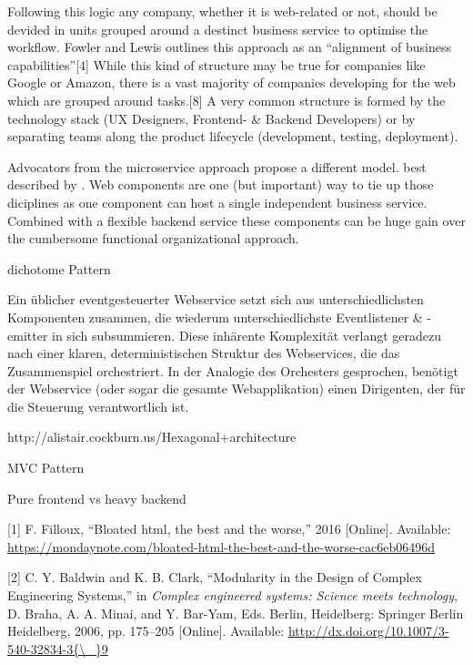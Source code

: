 \documentclass[]{article}
\begin{document}
Following this logic any company, whether it is web-related or not,
should be devided in units grouped around a destinct business service to
optimise the workflow. Fowler and Lewis outlines this approach as an
``alignment of business capabilities''{[}4{]} While this kind of
structure may be true for companies like Google or Amazon, there is a
vast majority of companies developing for the web which are grouped
around tasks.{[}8{]} A very common structure is formed by the technology
stack (UX Designers, Frontend- \& Backend Developers) or by separating
teams along the product lifecycle (development, testing, deployment).

Advocators from the microservice approach propose a different model.
best described by . Web components are one (but important) way to tie up
those diciplines as one component can host a single independent business
service. Combined with a flexible backend service these components can
be huge gain over the cumbersome functional organizational approach.

dichotome Pattern

Ein üblicher eventgesteuerter Webservice setzt sich aus
unterschiedlichsten Komponenten zusammen, die wiederum
unterschiedlichste Eventlistener \& -emitter in sich subsummieren. Diese
inhärente Komplexität verlangt geradezu nach einer klaren,
deterministischen Struktur des Webservices, die das Zusammenspiel
orchestriert. In der Analogie des Orchesters gesprochen, benötigt der
Webservice (oder sogar die gesamte Webapplikation) einen Dirigenten, der
für die Steuerung verantwortlich ist.

http://alistair.cockburn.us/Hexagonal+architecture

MVC Pattern

Pure frontend vs heavy backend

\hypertarget{refs}{}
\hypertarget{ref-Filloux2016}{}
{[}1{]} F. Filloux, ``Bloated html, the best and the worse,'' 2016
{[}Online{]}. Available:
\url{https://mondaynote.com/bloated-html-the-best-and-the-worse-cac6eb06496d}

\hypertarget{ref-Baldwin2006}{}
{[}2{]} C. Y. Baldwin and K. B. Clark, ``Modularity in the Design of
Complex Engineering Systems,'' in \emph{Complex engineered systems:
Science meets technology}, D. Braha, A. A. Minai, and Y. Bar-Yam, Eds.
Berlin, Heidelberg: Springer Berlin Heidelberg, 2006, pp. 175--205
{[}Online{]}. Available:
\href{http://dx.doi.org/10.1007/3-540-32834-3\%7B/_\%7D9}{http://dx.doi.org/10.1007/3-540-32834-3\{\textbackslash{}\_\}9}
\end{document}
